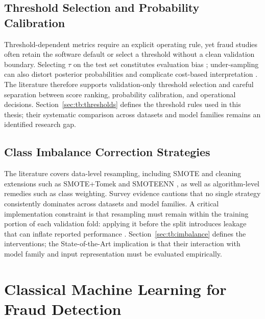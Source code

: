 \subsection{Threshold Selection and Probability Calibration}
\label{subsec:sota-threshold}

Threshold-dependent metrics require an explicit operating rule, yet fraud studies often retain the software default or select a threshold without a clean validation boundary. Selecting $\tau$ on the test set constitutes evaluation bias \cite{luzio2024decoupling}; under-sampling can also distort posterior probabilities and complicate cost-based interpretation \cite{dalpozzolo2015calibrating}. The literature therefore supports validation-only threshold selection and careful separation between score ranking, probability calibration, and operational decisions. Section~\ref{sec:tb:thresholds} defines the threshold rules used in this thesis; their systematic comparison across datasets and model families remains an identified research gap.

\subsection{Class Imbalance Correction Strategies}
\label{subsec:sota-imbalance-strategies}

The literature covers data-level resampling, including SMOTE \cite{chawla2002smote} and cleaning extensions such as SMOTE+Tomek and SMOTEENN \cite{batista2004balancing}, as well as algorithm-level remedies such as class weighting. Survey evidence \cite{hegarcia2009learning, krawczyk2016learning} cautions that no single strategy consistently dominates across datasets and model families. A critical implementation constraint is that resampling must remain within the training portion of each validation fold: applying it before the split introduces leakage that can inflate reported performance \cite{hayat2025leakage}. Section~\ref{sec:tb:imbalance} defines the interventions; the State-of-the-Art implication is that their interaction with model family and input representation must be evaluated empirically.

\section{Classical Machine Learning for Fraud Detection}
\label{subsec:classicML}

